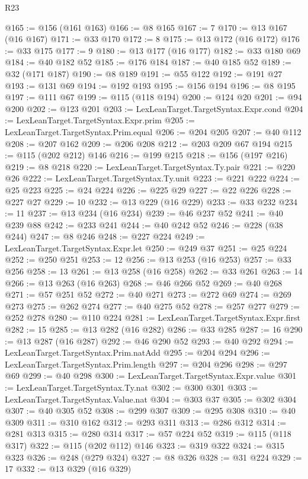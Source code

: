 \begin{lexlean}{R23}
\begin{coremodule}
@165 := @156 (@161 @163)
@166 := @8 @165
@167 := 7
@170 := @13 @167 (@16 @167)
@171 := @33 @170
@172 := 8
@175 := @13 @172 (@16 @172)
@176 := @33 @175
@177 := 9
@180 := @13 @177 (@16 @177)
@182 := @33 @180 @69
@184 := @40 @182 @52
@185 := @176 @184
@187 := @40 @185 @52
@189 := @32 (@171 @187)
@190 := @8 @189
@191 := @55 @122
@192 := @191 @27
@193 := @131 @69
@194 := @192 @193
@195 := @156 @194
@196 := @8 @195
@197 := @111 @67
@199 := @115 (@118 @194)
@200 := @124 @20
@201 := @94 @200
@202 := @123 @201
@203 := LexLeanTarget.TargetSyntax.Expr.cond
@204 := LexLeanTarget.TargetSyntax.Expr.prim
@205 := LexLeanTarget.TargetSyntax.Prim.equal
@206 := @204 @205
@207 := @40 @112
@208 := @207 @162
@209 := @206 @208
@212 := @203 @209 @67 @194
@215 := @115 (@202 @212) @146
@216 := @199 @215
@218 := @156 (@197 @216)
@219 := @8 @218
@220 := LexLeanTarget.TargetSyntax.Ty.pair
@221 := @220 @26
@222 := LexLeanTarget.TargetSyntax.Ty.unit
@223 := @221 @222
@224 := @25 @223
@225 := @24 @224
@226 := @225 @29
@227 := @22 @226
@228 := @227 @27
@229 := 10
@232 := @13 @229 (@16 @229)
@233 := @33 @232
@234 := 11
@237 := @13 @234 (@16 @234)
@239 := @46 @237 @52
@241 := @40 @239 @88
@242 := @233 @241
@244 := @40 @242 @52
@246 := @228 (@38 @244)
@247 := @8 @246
@248 := @227 @224
@249 := LexLeanTarget.TargetSyntax.Expr.let
@250 := @249 @37
@251 := @25 @224
@252 := @250 @251
@253 := 12
@256 := @13 @253 (@16 @253)
@257 := @33 @256
@258 := 13
@261 := @13 @258 (@16 @258)
@262 := @33 @261
@263 := 14
@266 := @13 @263 (@16 @263)
@268 := @46 @266 @52
@269 := @40 @268
@271 := @57 @251 @52
@272 := @40 @271
@273 := @272 @69
@274 := @269 @273
@275 := @262 @274
@277 := @40 @275 @52
@278 := @257 @277
@279 := @252 @278
@280 := @110 @224
@281 := LexLeanTarget.TargetSyntax.Expr.first
@282 := 15
@285 := @13 @282 (@16 @282)
@286 := @33 @285
@287 := 16
@290 := @13 @287 (@16 @287)
@292 := @46 @290 @52
@293 := @40 @292
@294 := LexLeanTarget.TargetSyntax.Prim.natAdd
@295 := @204 @294
@296 := LexLeanTarget.TargetSyntax.Prim.length
@297 := @204 @296
@298 := @297 @69
@299 := @40 @298
@300 := LexLeanTarget.TargetSyntax.Expr.value
@301 := LexLeanTarget.TargetSyntax.Ty.nat
@302 := @300 @301
@303 := LexLeanTarget.TargetSyntax.Value.nat
@304 := @303 @37
@305 := @302 @304
@307 := @40 @305 @52
@308 := @299 @307
@309 := @295 @308
@310 := @40 @309
@311 := @310 @162
@312 := @293 @311
@313 := @286 @312
@314 := @281 @313
@315 := @280 @314
@317 := @57 @224 @52
@319 := @115 (@118 @317)
@322 := @115 (@202 @112) @146
@323 := @319 @322
@324 := @315 @323
@326 := @248 (@279 @324)
@327 := @8 @326
@328 := @31 @224
@329 := 17
@332 := @13 @329 (@16 @329)

\end{coremodule}
\end{lexlean}
